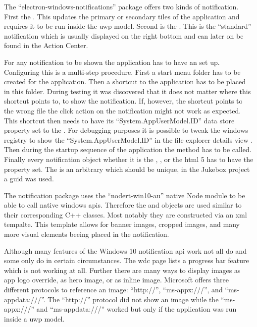 The \enquote{electron-windows-notifications} package offers two kinds of notification. First the . This updates the primary or secondary tiles of the application and requires it to be run inside the \gls{uwp} model. Second is the . This is the \enquote{standard} notification which is usually displayed on the right bottom and can later on be found in the Action Center.

For any notification to be shown the application has to have an  set up. Configuring this  is a multi-step procedure. First a start menu folder has to be created for the application. Then a shortcut to the application has to be placed in this folder. During testing it was discovered that it does not matter where this shortcut points to, to show the notification. If, however, the shortcut points to the wrong file the click action on the notification might not work as expected. This shortcut then needs to have its \enquote{System.AppUserModel.ID} data store property set to the  \cite{eNotWinAppId}. For debugging purposes it is possible to tweak the windows registry to show the \enquote{System.AppUserModel.ID} in the file explorer details view \cite{showAppId}. Then during the startup sequence of the application the  method has to be called. Finally every notification object whether it is the , , or the \gls{html} 5  has to have the  property set. The  is an arbitrary  which should be unique, in the Jukebox project a \gls{guid} was used.

The notification package uses the \enquote{nodert-win10-au} native Node module to be able to call native windows \gls{api}s. Therefore the  and  objects are used similar to their corresponding C++ classes. Most notably they are constructed via an \gls{xml} tempalte. This template allows for banner images, cropped images, and many more visual elements beeing placed in the notification.

Although many features of the Windows 10 notification \gls{api} work not all do and some only do in certain circumstances. The \gls{wdc} page \zB lists a progress bar feature which is not working at all. Further there are many ways to display images \zB as app logo override, as hero image, or as inline image. Microsoft offers three different protocols to reference an image: \enquote{http://}, \enquote{ms-appx:///}, and \enquote{ms-appdata:///}. The \enquote{http://} protocol did not show an image while the \enquote{ms-appx:///} and \enquote{ms-appdata:///} worked but only if the application was run inside a \gls{uwp} model. \cite{toastContent}

